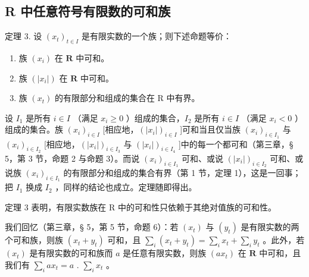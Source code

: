 \subsection{R 中任意符号有限数的可和族}

定理 3. 设 \((x_{t})_{t\in I}\) 是有限实数的一个族；则下述命题等价：

\begin{enumerate}
\def\labelenumi{\alph{enumi})}
\item
  族 \((x_{i})\) 在 \(\mathbf{R}\) 中可和。
\item
  族 \((|x_{i}|)\) 在 \(\mathbf{R}\) 中可和。
\item
  族 \((x_{t})\) 的有限部分和组成的集合在 R 中有界。
\end{enumerate}

设 \(I_1\) 是所有 \(i \in I\) （满足 \(x_i \geq 0\) ）组成的集合，\(I_2\) 是所有 \(i \in I\) （满足 \(x_i < 0\) ）组成的集合。族 \((x_i)_{i \in I}\) {[}相应地，\((|x_i|)_{i \in I}\) {]}可和当且仅当族 \((x_i)_{i \in I_1}\) 与 \((x_i)_{i \in I_2}\) {[}相应地，\((|x_i|)_{i \in I_3}\) 与 \((|x_i|)_{i \in I_4}\) {]}中的每一个都可和（第三章，§ 5，第 3 节，命题 2 与命题 3）。而说 \((x_i)_{i \in I_1}\) 可和、或说 \((|x_i|)_{i \in I_2}\) 可和、或说族 \((x_{i})_{i\in I_1}\) 的有限部分和组成的集合有界（第 1 节，定理 1），这是一回事；把 \(I_1\) 换成 \(I_2\) ，同样的结论也成立。定理随即得出。

定理 3 表明，有限实数族在 R 中的可和性只依赖于其绝对值族的可和性。

我们回忆（第三章，§ 5，第 5 节，命题 6）：若 \((x_{t})\) 与 \((y_{t})\) 是有限实数的两个可和族，则族 \((x_{t} + y_{t})\) 可和，且 \(\sum_{i}(x_{t} + y_{t}) = \sum_{i}x_{t} + \sum_{i}y_{t}\) 。此外，若 \((x_{t})\) 是有限实数的可和族而 \(a\) 是任意有限实数，则族 \((ax_{t})\) 在 \(\mathbf{R}\) 中可和，且我们有 \(\sum_{i}ax_{t} = a\) . \(\sum_{i}x_{t}\) 。

